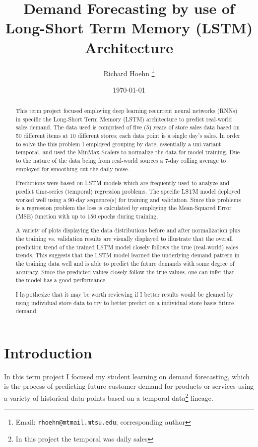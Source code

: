 \documentclass[10pt, journal, letterpaper, compsoc]{IEEEtran}
\title{Demand Forecasting by use of\\Long-Short Term Memory (LSTM) Architecture}
\author{Richard Hoehn%
	\thanks{Email: \texttt{rhoehn@mtmail.mtsu.edu}; corresponding author}}
\affil{Middle Tennessee State University\\ \small CSCI 7850\\ \small Prof. Dr. Joshua L. Phillips}
\date{\vspace{1em}\today}
\begin{document}
\maketitle

\begin{abstract}
This term project focused employing deep learning recurrent neural networks (RNNs) in specific the Long-Short Term Memory (LSTM) architecture to predict real-world sales demand. The data used is comprised of five (5) years of store sales data based on 50 different items at 10 different stores; each data point is a single day's sales. In order to solve the this problem I employed grouping by date, essentially a uni-variant temporal, and used the MinMax-Scalers to normalize the data for model training. Due to the nature of the data being from real-world sources a 7-day rolling average to employed for smoothing out the daily noise.

Predictions were based on LSTM models which are frequently used\cite{pharma-sales-forecast-lstm} to analyze and predict time-series (temporal) regression problems. The specific LSTM model deployed worked well using a 90-day sequence(s) for training and validation. Since this problems is a regression problem the loss is calculated by employing the Mean-Squared Error (MSE) function with up to 150 epochs during training.

A variety of plots displaying the data distributions before and after normalization plus the training vs. validation results are visually displayed to illustrate that the overall prediction trend of the trained LSTM model closely follows the true (real-world) sales trends. This suggests that the LSTM model learned the underlying demand pattern in the training data well and is able to predict the future demands with some degree of accuracy. Since the predicted values closely follow the true values, one can infer that the model has a good performance.

I hypothesize that it may be worth reviewing if I better results would be gleaned by using individual store data to try to better predict on a individual store basis future demand.
\end{abstract}


\section{Introduction}
In this term project I focused my student learning on demand forecasting, which is the process of predicting future customer demand for products or services using a variety of historical data-points based on a temporal data\footnote{In this project the temporal was daily sales} lineage.
\end{document}
